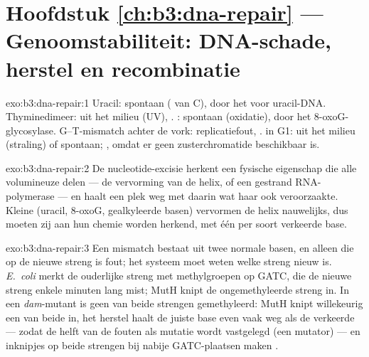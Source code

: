 \section*{Hoofdstuk \ref{ch:b3:dna-repair} --- Genoomstabiliteit: DNA-schade, herstel en recombinatie}

\begin{solution}{exo:b3:dna-repair:1}
Uracil: spontaan ( van C),  door het
 voor uracil-DNA. Thyminedimeer: uit het milieu (UV),
. : spontaan (oxidatie),
 door het 8-oxoG-glycosylase. G--T-mismatch achter
de vork: replicatiefout, .  in G1:
uit het milieu (straling) of spontaan; ,
omdat er geen zusterchromatide beschikbaar is.
\end{solution}

\begin{solution}{exo:b3:dna-repair:2}
De nucleotide-excisie herkent een fysische eigenschap die alle
volumineuze  delen --- de vervorming van de helix, of een
gestrand RNA-polymerase --- en haalt een plek weg met daarin wat haar
ook veroorzaakte. Kleine  (uracil, 8-oxoG, gealkyleerde basen)
vervormen de helix nauwelijks, dus moeten zij aan hun chemie worden
herkend, met één  per soort verkeerde base.
\end{solution}

\begin{solution}{exo:b3:dna-repair:3}
Een mismatch bestaat uit twee normale basen, en alleen die op de
nieuwe streng is fout; het systeem moet weten welke streng nieuw is.
\emph{E.~coli} merkt de ouderlijke streng met methylgroepen op GATC,
die de nieuwe streng enkele minuten lang mist; MutH knipt de
ongemethyleerde streng in. In een \emph{dam}-mutant is geen van beide
strengen gemethyleerd: MutH knipt willekeurig een van beide in, het
herstel haalt de juiste base even vaak weg als de verkeerde --- zodat
de helft van de fouten als mutatie wordt vastgelegd (een mutator) ---
en inknipjes op beide strengen bij nabije GATC-plaatsen maken
.
\end{solution}

